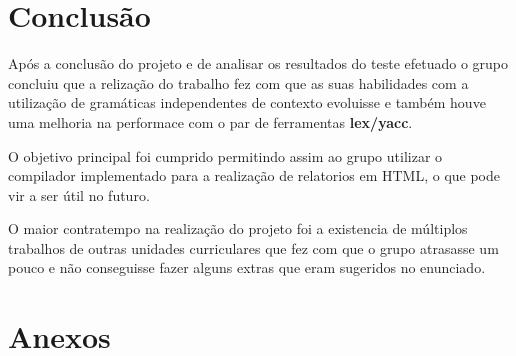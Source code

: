 \documentclass{report}
\begin{document}
\chapter{Conclusão}
Após a conclusão do projeto e de analisar os resultados do teste efetuado o grupo concluiu que a relização do trabalho fez com que as suas habilidades com a utilização de gramáticas independentes de contexto evoluisse e também houve uma melhoria na performace com o par de ferramentas \textbf{lex/yacc}.

O objetivo principal foi cumprido permitindo assim ao grupo utilizar o compilador implementado para a realização de relatorios em HTML, o que pode vir a ser útil no futuro.

O maior contratempo na realização do projeto foi a existencia de múltiplos trabalhos de outras unidades curriculares que fez com que o grupo atrasasse um pouco e não conseguisse fazer alguns extras que eram sugeridos no enunciado.

\chapter{Anexos}
\end{document}
